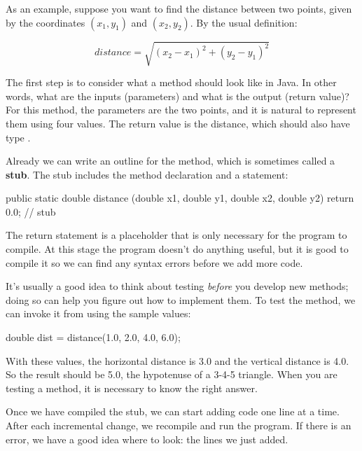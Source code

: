 As an example, suppose you want to find the distance between two points, given by the coordinates $(x_1, y_1)$ and $(x_2, y_2)$.
By the usual definition:

\[ distance = \sqrt{(x_2 - x_1)^2 +(y_2 - y_1)^2} \]

The first step is to consider what a  method should look like in Java.
In other words, what are the inputs (parameters) and what is the output (return value)?
For this method, the parameters are the two points, and it is natural to represent them using four  values.
The return value is the distance, which should also have type .


Already we can write an outline for the method, which is sometimes called a {\bf stub}.
The stub includes the method declaration and a  statement:

\begin{code}
public static double distance
        (double x1, double y1, double x2, double y2) {
    return 0.0;  // stub
}
\end{code}

The return statement is a placeholder that is only necessary for the program to compile.
At this stage the program doesn't do anything useful, but it is good to compile it so we can find any syntax errors before we add more code.


It's usually a good idea to think about testing {\em before} you develop new methods; doing so can help you figure out how to implement them.
To test the method, we can invoke it from  using the sample values:

\begin{code}
double dist = distance(1.0, 2.0, 4.0, 6.0);
\end{code}

With these values, the horizontal distance is 3.0 and the vertical distance is 4.0.
So the result should be 5.0, the hypotenuse of a 3-4-5 triangle.
When you are testing a method, it is necessary to know the right answer.

Once we have compiled the stub, we can start adding code one line at a time.
After each incremental change, we recompile and run the program.
If there is an error, we have a good idea where to look: the lines we just added.

